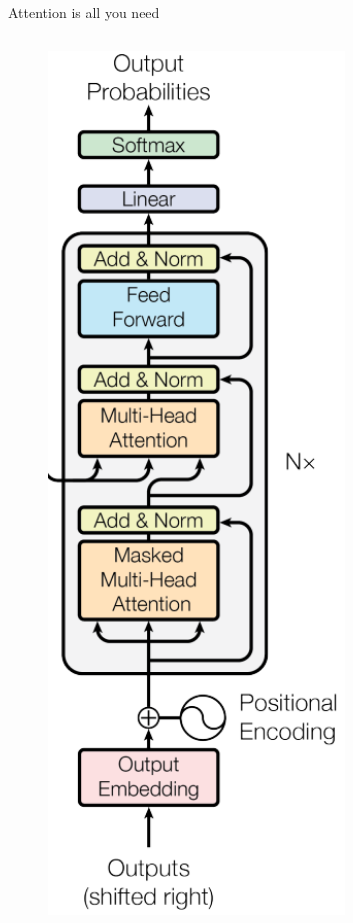 \begin{frame}[c]{Attention is all you need}
\begin{columns}[c]
\begin{column}{0.3\textwidth}
\begin{figure}
			\includegraphics[width=0.7\textwidth]{figures/transformerdecoder.png}
		\end{figure}
	\end{column}
\end{columns}
\end{frame}

